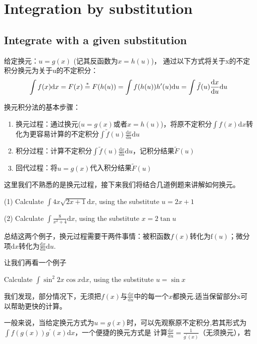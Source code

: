 \documentclass[lang=cn,newtx,10pt,scheme=chinese]{elegantbook}
\begin{document}
\chapter{Integration by substitution}
\section{Integrate with a given substitution}
给定换元：$u=g(x)$ (记其反函数为$x=h(u)$)，
通过以下方式将关于x的不定积分换元为关于u的不定积分：
\begin{equation*}
  \int f(x)\mathrm{d}x = F(x) \overset{\rm{*}} = F(h(u)) = \int f(h(u)) h^{\prime}(u)\mathrm{d}u =  \int \tilde{f}(u)\frac{\mathrm{d}x}{\mathrm{d}u}\mathrm{d}u 
\end{equation*}

换元积分法的基本步骤：
\begin{enumerate}
\item 换元过程：通过换元($u=g(x)$或者$x=h(u)$)，将原不定积分$\int f(x)\mathrm{d}x$转化为更容易计算的不定积分$\int \tilde{f}(u)\frac{\mathrm{d}x}{\mathrm{d}u}\mathrm{d}u$
\item 积分过程：计算不定积分$\int \tilde{f}(u)\frac{\mathrm{d}x}{\mathrm{d}u}\mathrm{d}u$，记积分结果$\tilde{F}(u)$
\item 回代过程：将$u=g(x)$代入积分结果$\tilde{F}(u)$
\end{enumerate}

这里我们不熟悉的是换元过程，接下来我们将结合几道例题来讲解如何换元。
\begin{example}
  (1) Calculate $\int 4x \sqrt{2x+1}\mathrm{d}x$, using the substitute $u=2x+1$
  
  (2) Calculate $\int \frac{8}{x^2+4}\mathrm{d}x$, using the substitute $x=2\tan u$
\end{example}
总结这两个例子，换元过程需要干两件事情：被积函数$f(x)$转化为$\mathrm{f}(u)$；微分项$\mathrm{d}x$转化为$\frac{\mathrm{d}x}{\mathrm{d}u}\mathrm{d}u$. 

让我们再看一个例子
\begin{example}
 Calculate $\int {\sin}^2 2x \cos x \mathrm{d}x$, using the substitute $u=\sin x$
\end{example}
我们发现，部分情况下，无须把$f(x)$与$\frac{\mathrm{d}x}{\mathrm{d}u}$中的每一个$x$都换元.适当保留部分x可以帮助更快的计算。

一般来说，当给定换元方式为$u=g(x)$时，可以先观察原不定积分,若其形式为$\int f(g(x))g^{\prime}(x)\mathrm{d}x$，一个便捷的换元方式是
计算$\frac{\mathrm{d}x}{\mathrm{d}u}=\frac{1}{g^{\prime}(x)}$（无须换元），若
\end{document}
